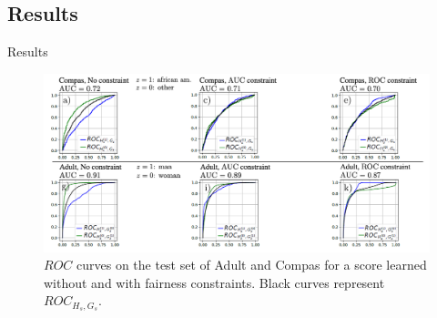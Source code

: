 \subsection{Results}
\begin{frame}{Results}
    \begin{figure}
        \centering
        \includegraphics[width=\textwidth]{images/resultsmodified.png}
            \caption{$ROC$ curves on the test set of Adult and Compas
            for a score learned without and with fairness constraints.
            Black curves represent $ROC_{H_s,G_s}$.}
            \label{fig:roc_real_main_text}
    \end{figure}
        
\end{frame}
